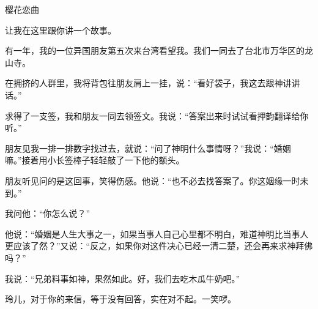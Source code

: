 \begin{center}
    \par 樱花恋曲
\end{center}
\par {}
\par 让我在这里跟你讲一个故事。
\par 有一年，我的一位异国朋友第五次来台湾看望我。我们一同去了台北市万华区的龙山寺。
\par 在拥挤的人群里，我将背包往朋友肩上一挂，说：“看好袋子，我这去跟神讲讲话。”
\par 求得了一支签，我和朋友一同去领签文。我说：“答案出来时试试看押韵翻译给你听。”
\par 朋友见我一排一排数字找过去，就说：“问了神明什么事情呀？”我说：“婚姻嘛。”接着用小长签棒子轻轻敲了一下他的额头。
\par 朋友听见问的是这回事，笑得伤感。他说：“也不必去找答案了。你这姻缘一时未到。”
\par 我问他：“你怎么说？”
\par 他说：“婚姻是人生大事之一，如果当事人自己心里都不明白，难道神明比当事人更应该了然？”又说：“反之，如果你对这件决心已经一清二楚，还会再来求神拜佛吗？”
\par 我说：“兄弟料事如神，果然如此。好，我们去吃木瓜牛奶吧。”
\par 玲儿，对于你的来信，等于没有回答，实在对不起。一笑啰。
\par {}

